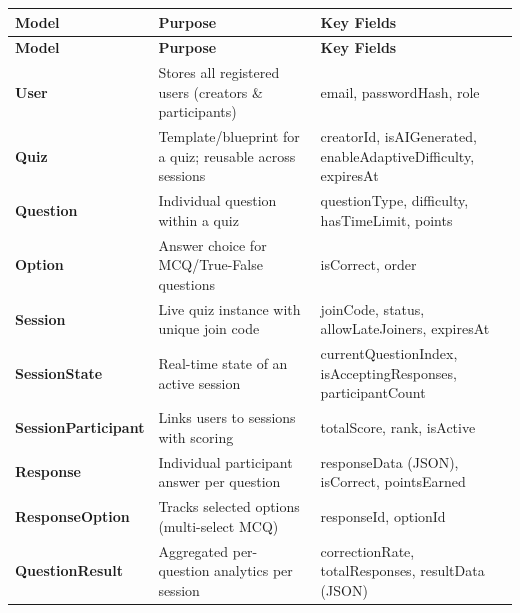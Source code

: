 \documentclass[12pt,a4paper]{article}
\begin{document}
\begin{longtable}{>{\bfseries}p{3.5cm} p{9cm} p{2.5cm}}
  \toprule
  \textbf{Model} & \textbf{Purpose} & \textbf{Key Fields} \\
  \midrule
  \endfirsthead
  \toprule
  \textbf{Model} & \textbf{Purpose} & \textbf{Key Fields} \\
  \midrule
  \endhead
  \bottomrule
  \endfoot
  User              & Stores all registered users (creators \& participants) & email, passwordHash, role \\[4pt]
  Quiz              & Template/blueprint for a quiz; reusable across sessions & creatorId, isAIGenerated, enableAdaptiveDifficulty, expiresAt \\[4pt]
  Question          & Individual question within a quiz & questionType, difficulty, hasTimeLimit, points \\[4pt]
  Option            & Answer choice for MCQ/True-False questions & isCorrect, order \\[4pt]
  Session           & Live quiz instance with unique join code & joinCode, status, allowLateJoiners, expiresAt \\[4pt]
  SessionState      & Real-time state of an active session & currentQuestionIndex, isAcceptingResponses, participantCount \\[4pt]
  SessionParticipant & Links users to sessions with scoring & totalScore, rank, isActive \\[4pt]
  Response          & Individual participant answer per question & responseData (JSON), isCorrect, pointsEarned \\[4pt]
  ResponseOption    & Tracks selected options (multi-select MCQ) & responseId, optionId \\[4pt]
  QuestionResult    & Aggregated per-question analytics per session & correctionRate, totalResponses, resultData (JSON) \\
\end{longtable}
\end{document}
